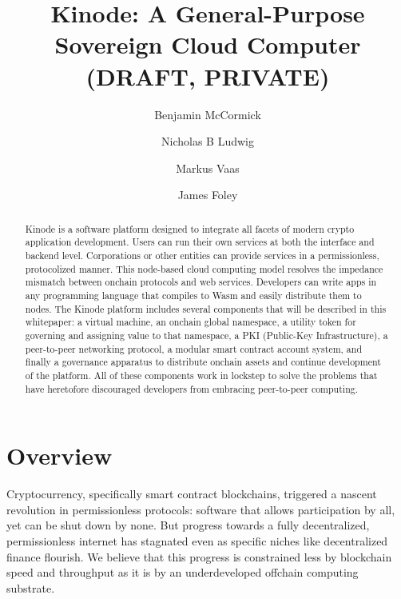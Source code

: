 \documentclass[runningheads]{llncs}
\begin{document}
%
\title{Kinode: A General-Purpose Sovereign Cloud Computer (DRAFT, PRIVATE)}
%
%
\author{
Benjamin McCormick \and
Nicholas B Ludwig \and
Markus Vaas \and
James Foley
}
%
\maketitle %
%
\begin{abstract}
Kinode is a software platform designed to integrate all facets of modern crypto application development.
Users can run their own services at both the interface and backend level.
Corporations or other entities can provide services in a permissionless, protocolized manner.
This node-based cloud computing model resolves the impedance mismatch between onchain protocols and web services.
Developers can write apps in any programming language that compiles to Wasm and easily distribute them to nodes.
The Kinode platform includes several components that will be described in this whitepaper: a virtual machine, an onchain global namespace, a utility token for governing and assigning value to that namespace, a PKI (Public-Key Infrastructure), a peer-to-peer networking protocol, a modular smart contract account system, and finally a governance apparatus to distribute onchain assets and continue development of the platform.
All of these components work in lockstep to solve the problems that have heretofore discouraged developers from embracing peer-to-peer computing.

\end{abstract}
%
\tableofcontents
%
%
%
%
\section{Overview}
\label{sec:overview}

Cryptocurrency, specifically smart contract blockchains, triggered a nascent revolution in permissionless protocols: software that allows participation by all, yet can be shut down by none.
But progress towards a fully decentralized, permissionless internet has stagnated even as specific niches like decentralized finance flourish.
We believe that this progress is constrained less by blockchain speed and throughput as it is by an underdeveloped offchain computing substrate.
\end{document}
